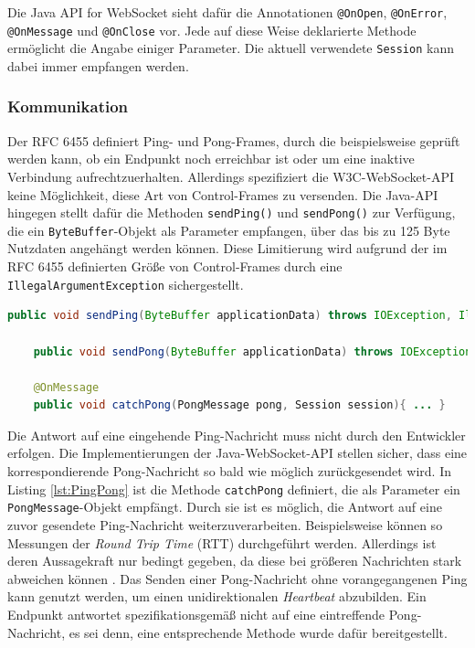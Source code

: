 \documentclass[11pt,a4paper,titlepage]{scrartcl}
\numberwithin{equation}{section}
\begin{document}
\noindent Die Java\texttrademark{} API for WebSocket sieht dafür die Annotationen \texttt{@OnOpen}, \texttt{@OnError}, \texttt{@OnMessage} und \texttt{@OnClose} vor. Jede auf diese Weise deklarierte Methode ermöglicht die Angabe einiger Parameter. Die aktuell verwendete \texttt{Session} kann dabei immer empfangen werden. \\

\subsubsection{Kommunikation}\label{subsubsec:javaKommunikation}
Der RFC 6455 definiert Ping- und Pong-Frames, durch die beispielsweise geprüft werden kann, ob ein Endpunkt noch erreichbar ist oder um eine inaktive Verbindung aufrechtzuerhalten. Allerdings spezifiziert die W3C-WebSocket-API keine Möglichkeit, diese Art von Control-Frames zu versenden. Die Java-API hingegen stellt dafür die Methoden \texttt{sendPing()} und \texttt{sendPong()} zur Verfügung, die ein \texttt{ByteBuffer}-Objekt als Parameter empfangen, über das bis zu 125 Byte Nutzdaten angehängt werden können. Diese Limitierung wird aufgrund der im RFC 6455 definierten Größe von Control-Frames durch eine \texttt{IllegalArgumentException} sichergestellt.\\

\begin{lstlisting}[frame=single, language=Java, caption=Java: Ping-/Pong-Nachrichten, label=lst:PingPong]
	public void sendPing(ByteBuffer applicationData) throws IOException, IllegalArgumentException

	public void sendPong(ByteBuffer applicationData) throws IOException, IllegalArgumentException

	@OnMessage
	public void catchPong(PongMessage pong, Session session){ ... }
\end{lstlisting}

\noindent Die Antwort auf eine eingehende Ping-Nachricht muss nicht durch den Entwickler erfolgen. Die Implementierungen der Java-WebSocket-API stellen sicher, dass eine korrespondierende Pong-Nachricht so bald wie möglich zurückgesendet wird. In Listing \ref{lst:PingPong} ist die Methode \texttt{catchPong} definiert, die als Parameter ein \texttt{PongMessage}-Objekt empfängt. Durch sie ist es möglich, die Antwort auf eine zuvor gesendete Ping-Nachricht weiterzuverarbeiten. Beispielsweise können so Messungen der \textit{Round Trip Time} (RTT) durchgeführt werden. Allerdings ist deren Aussagekraft nur bedingt gegeben, da diese bei größeren Nachrichten stark abweichen können \autocite[116]{coward_java_2014}. Das Senden einer Pong-Nachricht ohne vorangegangenen Ping kann genutzt werden, um einen unidirektionalen \textit{Heartbeat} abzubilden. Ein Endpunkt antwortet spezifikationsgemäß nicht auf eine eintreffende Pong-Nachricht, es sei denn, eine entsprechende Methode wurde dafür bereitgestellt. \\
\end{document}
